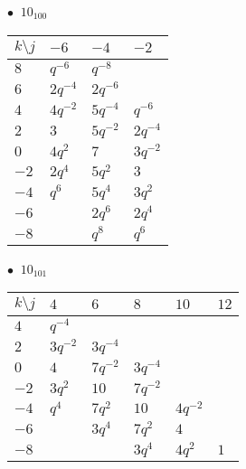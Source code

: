 \begin{minipage}{\linewidth}
$\bullet\ $ $10_{100}$ \vspace{0.5em} \\
\begin{tabular}{l|lll}
$k \setminus j$ & $-6$ & $-4$ & $-2$ \\
\hline
$8$ & $q^{-6}$ & $q^{-8}$ &  \\
$6$ & $2q^{-4}$ & $2q^{-6}$ &  \\
$4$ & $4q^{-2}$ & $5q^{-4}$ & $q^{-6}$ \\
$2$ & $3$ & $5q^{-2}$ & $2q^{-4}$ \\
$0$ & $4q^{2}$ & $7$ & $3q^{-2}$ \\
$-2$ & $2q^{4}$ & $5q^{2}$ & $3$ \\
$-4$ & $q^{6}$ & $5q^{4}$ & $3q^{2}$ \\
$-6$ &  & $2q^{6}$ & $2q^{4}$ \\
$-8$ &  & $q^{8}$ & $q^{6}$ \\
\end{tabular}
\vspace{2em}
\end{minipage}
%
\begin{minipage}{\linewidth}
$\bullet\ $ $10_{101}$ \vspace{0.5em} \\
\begin{tabular}{l|lllll}
$k \setminus j$ & $4$ & $6$ & $8$ & $10$ & $12$ \\
\hline
$4$ & $q^{-4}$ &  &  &  &  \\
$2$ & $3q^{-2}$ & $3q^{-4}$ &  &  &  \\
$0$ & $4$ & $7q^{-2}$ & $3q^{-4}$ &  &  \\
$-2$ & $3q^{2}$ & $10$ & $7q^{-2}$ &  &  \\
$-4$ & $q^{4}$ & $7q^{2}$ & $10$ & $4q^{-2}$ &  \\
$-6$ &  & $3q^{4}$ & $7q^{2}$ & $4$ &  \\
$-8$ &  &  & $3q^{4}$ & $4q^{2}$ & $1$ \\
\end{tabular}
\vspace{2em}
\end{minipage}
%
